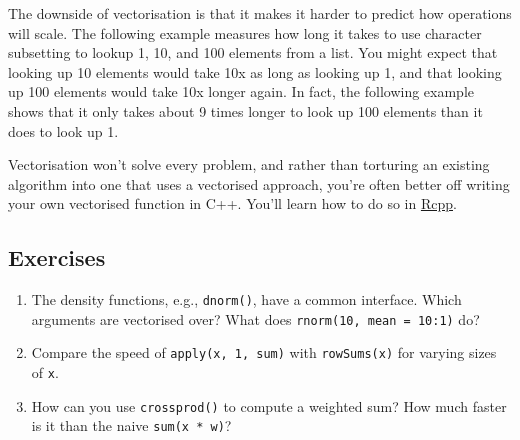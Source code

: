 The downside of vectorisation is that it makes it harder to predict how
operations will scale. The following example measures how long it takes
to use character subsetting to lookup 1, 10, and 100 elements from a
list. You might expect that looking up 10 elements would take 10x as
long as looking up 1, and that looking up 100 elements would take 10x
longer again. In fact, the following example shows that it only takes
about 9 times longer to look up 100 elements than it does to look up 1.

\begin{Shaded}
\begin{Highlighting}[]
\StringTok{ }\NormalTok{(}\NormalTok{(}\NormalTok{(}\NormalTok{, }

\StringTok{ }\NormalTok{)}
\StringTok{ }\NormalTok{, } \NormalTok{)}

\NormalTok{(}
\NormalTok{)}
\end{Highlighting}
\end{Shaded}

Vectorisation won't solve every problem, and rather than torturing an
existing algorithm into one that uses a vectorised approach, you're
often better off writing your own vectorised function in C++. You'll
learn how to do so in \hyperref[rcpp]{Rcpp}.

\subsection{Exercises}

\begin{enumerate}
\def\labelenumi{\arabic{enumi}.}
\item
  The density functions, e.g., \texttt{dnorm()}, have a common
  interface. Which arguments are vectorised over? What does
  \texttt{rnorm(10, mean = 10:1)} do?
\item
  Compare the speed of \texttt{apply(x, 1, sum)} with
  \texttt{rowSums(x)} for varying sizes of \texttt{x}.
\item
  How can you use \texttt{crossprod()} to compute a weighted sum? How
  much faster is it than the naive \texttt{sum(x * w)}?
\end{enumerate}

